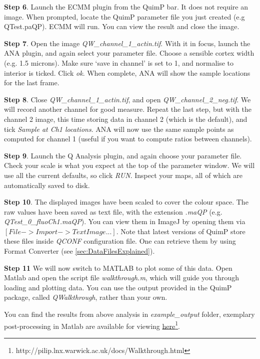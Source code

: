 \documentclass[a4paper,12pt]{article}
\begin{document}
\textbf{Step 6}. Launch the ECMM plugin from the QuimP bar. It does not require an image. When prompted,
locate the QuimP parameter file you just created (e.g QTest.paQP).  ECMM will run.
You can view the result and close the image.

\textbf{Step 7}. Open the image \textit{QW\_channel\_1\_actin.tif}.  With it in focus, launch the ANA plugin,
and again select your parameter file.  Choose a sensible cortex width (e.g. 1.5 microns).
Make sure `save in channel' is set to 1, and normalise to interior is ticked.  Click \emph{ok}.
When complete, ANA will show the sample locations for the last frame.

\textbf{Step 8}. Close \textit{QW\_channel\_1\_actin.tif}, and open \textit{QW\_channel\_2\_neg.tif}.  We will record another
channel for good measure.  Repeat the last step, but with the channel 2 image, this time storing
data in channel 2 (which is the default), and tick \emph{Sample at Ch1 locations}.  ANA will now
use the same sample points as computed for channel 1 (useful if you want to compute ratios between channels).

\textbf{Step 9}. Launch the Q Analysis plugin, and again choose your parameter file. Check your scale is what you expect at the top of the parameter window. We will use all the
current defaults, so click \emph{RUN}.  Inspect your maps, all of which are automatically saved to disk.

\textbf{Step 10}. The displayed images have been scaled to cover the colour space. The raw values have been saved
as text file, with the extension \emph{.maQP} (e.g.  \textit{QTest\_0\_fluoCh1.maQP}).
You can view them in ImageJ by opening them via $[File -> Import -> Text Image...]$. Note that latest versions of QuimP store these files inside \textit{QCONF} configuration file. One can retrieve them by using Format Converter (see \autoref{sec:DataFilesExplained}).

\textbf{Step 11} We will now switch to MATLAB to plot some of this data.  Open Matlab
and open the script file \textit{walkthrough.m}, which will guide you through loading and plotting data.
You can use the output provided in the QuimP package, called \textit{QWalkthrough}, rather than
your own.

You can find the results from above analysis in \textit{example\_output} folder, exemplary post-processing in Matlab are available for viewing  \href{http://pilip.lnx.warwick.ac.uk/docs/Walkthrough.html}{here}\footnote{http://pilip.lnx.warwick.ac.uk/docs/Walkthrough.html}.
\end{document}
